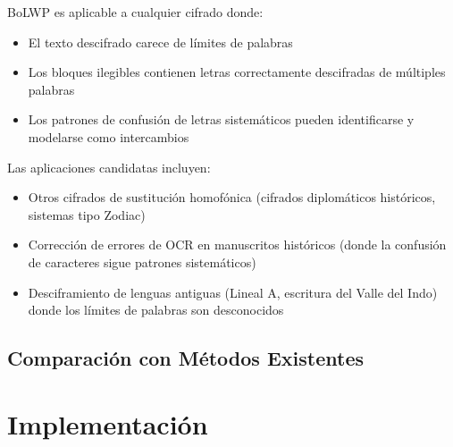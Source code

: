 \documentclass[11pt,a4paper]{article}
\begin{document}
BoLWP es aplicable a cualquier cifrado donde:
\begin{itemize}
\item El texto descifrado carece de límites de palabras
\item Los bloques ilegibles contienen letras correctamente descifradas de múltiples palabras
\item Los patrones de confusión de letras sistemáticos pueden identificarse y modelarse como intercambios
\end{itemize}

Las aplicaciones candidatas incluyen:
\begin{itemize}
\item Otros cifrados de sustitución homofónica (cifrados diplomáticos históricos, sistemas tipo Zodiac)
\item Corrección de errores de OCR en manuscritos históricos (donde la confusión de caracteres sigue patrones sistemáticos)
\item Desciframiento de lenguas antiguas (Lineal A, escritura del Valle del Indo) donde los límites de palabras son desconocidos
\end{itemize}

\subsection{Comparación con Métodos Existentes}

\begin{table}[htbp]
\centering
{}
\end{table}

\section{Implementación}
\end{document}
